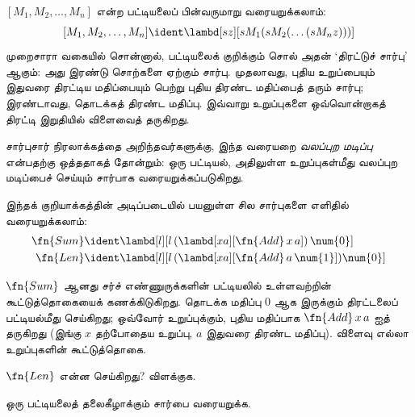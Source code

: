 \documentclass[../../../include/open-logic-section]{subfiles}
\begin{document}

$[M_1, M_2, \ldots, M_n]$ என்ற பட்டியலைப் பின்வருமாறு வரையறுக்கலாம்:
\[
  [M_1, M_2, \ldots, M_n] \ident \lambd[sz][s M_1 (s M_2 (\ldots (s M_n z)))]
\]
முறைசாரா வகையில் சொன்னால், பட்டியலைக் குறிக்கும் சொல் அதன்
‘திரட்டுச் சார்பு’ ஆகும்: அது இரண்டு சொற்களை ஏற்கும் சார்பு.
முதலாவது, புதிய உறுப்பையும் இதுவரை திரட்டிய மதிப்பையும் பெற்று
புதிய திரண்ட மதிப்பைத் தரும் சார்பு; இரண்டாவது, தொடக்கத் திரண்ட
மதிப்பு. இவ்வாறு உறுப்புகளை ஒவ்வொன்றாகத் திரட்டி இறுதியில்
விளைவைத் தருகிறது.

\begin{digress}
  சார்புசார் நிரலாக்கத்தை அறிந்தவர்களுக்கு, இந்த வரையறை
  \emph{வலப்புற மடிப்பு} என்பதற்கு ஒத்ததாகத் தோன்றும்:
  ஒரு பட்டியல், அதிலுள்ள உறுப்புகள்மீது வலப்புற மடிப்பைச் செய்யும்
  சார்பாக வரையறுக்கப்படுகிறது.
\end{digress}

இந்தக் குறியாக்கத்தின் அடிப்படையில் பயனுள்ள சில சார்புகளை எளிதில்
வரையறுக்கலாம்:
\begin{align*}
  \fn{Sum} & \ident
  \lambd[l][l \, (\lambd[xa][\fn{Add} \, x \, a])\,  \num{0}]\\
  \fn{Len} & \ident
  \lambd[l][l \, (\lambd[xa][\fn{Add} \, a \, \num{1}]) \num{0}]
\end{align*}

$\fn{Sum}$ ஆனது சர்ச் எண்ணுருக்களின் பட்டியலில் உள்ளவற்றின்
கூட்டுத்தொகையைக் கணக்கிடுகிறது. தொடக்க மதிப்பு $\num{0}$
ஆக இருக்கும் திரட்டலைப் பட்டியல்மீது செய்கிறது; ஒவ்வோர் உறுப்புக்கும்,
புதிய மதிப்பாக $\fn{Add} \, x\, a$ ஐத் தருகிறது
(இங்கு $x$ தற்போதைய உறுப்பு, $a$ இதுவரை திரண்ட மதிப்பு).
விளைவு எல்லா உறுப்புகளின் கூட்டுத்தொகை.

\begin{prob}
  $\fn{Len}$ என்ன செய்கிறது? விளக்குக.
\end{prob}

\begin{prob}
  ஒரு பட்டியலைத் தலைகீழாக்கும் சார்பை வரையறுக்க.
\end{prob}
\end{document}
